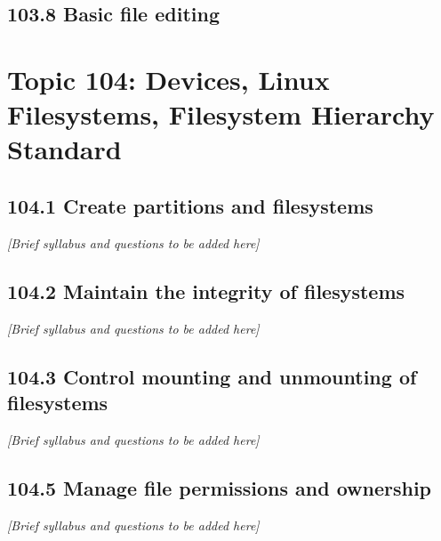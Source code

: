 \documentclass[12pt,a4paper]{report}
\begin{document}


\section*{103.8 Basic file editing}




\chapter{Topic 104: Devices, Linux Filesystems, Filesystem Hierarchy Standard}

\section{104.1 Create partitions and filesystems}
\textit{[Brief syllabus and questions to be added here]}

\section{104.2 Maintain the integrity of filesystems}
\textit{[Brief syllabus and questions to be added here]}

\section{104.3 Control mounting and unmounting of filesystems}
\textit{[Brief syllabus and questions to be added here]}

\section{104.5 Manage file permissions and ownership}
\textit{[Brief syllabus and questions to be added here]}
\end{document}
